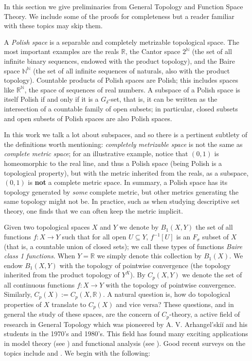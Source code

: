 \documentclass[psamsfonts]{amsart}
\theoremstyle{definition}
\theoremstyle{remark}
\numberwithin{equation}{section}
\begin{document}
In this section we give preliminaries from General Topology and Function Space Theory. We include some of the proofs for completeness but a reader familiar with these topics may skip them.

A \emph{Polish space} is a separable and completely metrizable topological space. The most important examples are the reals $\mathbb R$, the Cantor space $2^\mathbb N$ (the set of all infinite binary sequences, endowed with the product topology), and the Baire space $\mathbb N^\mathbb N$ (the set of all infinite sequences of naturals, also with the product topology). Countable products of Polish spaces are Polish; this includes spaces like $\mathbb R^\mathbb N$, the space of sequences of real numbers. A subspace of a Polish space is itself Polish if and only if it is a $G_\delta$-set, that is, it can be written as the intersection of a countable family of open subsets; in particular, closed subsets and open subsets of Polish spaces are also Polish spaces.

In this work we talk a lot about subspaces, and so there is a pertinent subtlety of the definitions worth mentioning: \emph{completely metrizable space} is not the same as \emph{complete metric space}; for an illustrative example, notice that $(0,1)$ is homeomorphic to the real line, and thus a Polish space (being Polish is a topological property), but with the metric inherited from the reals, as a subspace, $(0,1)$ is \textbf{not} a complete metric space. In summary, a Polish space has its topology generated by \emph{some} complete metric, but other metrics generating the same topology might not be. In practice, such as when studying descriptive set theory, one finds that we can often keep the metric implicit.

Given two topological spaces $X$ and $Y$ we denote by $B_1(X,Y)$ the set of all functions $f:X\to Y$ such that for all open $U\subseteq Y$, $f^{-1}[U]$ is an $F_\sigma$ subset of $X$ (that is, a countable union of closed sets); we call these types of functions \emph{Baire class 1 functions}. When $Y=\mathbb{R}$ we simply denote this collection by $B_1(X)$. We endow $B_1(X,Y)$ with the topology of pointwise convergence (the topology inherited from the product topology of $Y^X$). By $C_p(X,Y)$ we denote the set of all continuous functions $f:X\rightarrow Y$ with the topology of pointwise convergence. Similarly, $C_p(X):=C_p(X,\mathbb{R})$. A natural question is, how do topological properties of $X$ translate to $C_p(X)$ and vice versa? These questions, and in general the study of these spaces, are the concern of $C_p$-theory, a active field of research in General Topology which was pioneered by A. V. Arhangel’skiĭ and his students in the 1970's and 1980's. This field has found many exciting applications in model theory (see \cite{hamel2021cp}) and functional analysis (see \cite{iovino2020banach}). Good recent surveys on the topics include \cite{hamel2023cp} and \cite{tkachuk2011cp}. We begin with the following:
\end{document}
